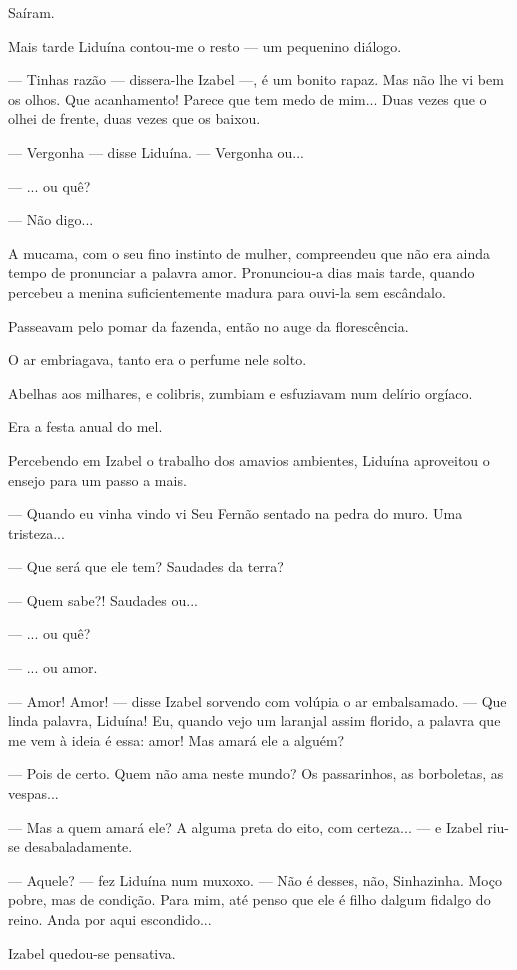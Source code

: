 Saíram.

Mais tarde Liduína contou-me o resto --- um pequenino diálogo.

--- Tinhas razão --- dissera-lhe Izabel ---, é um bonito rapaz. Mas não
lhe vi bem os olhos. Que acanhamento! Parece que tem medo de mim... Duas
vezes que o olhei de frente, duas vezes que os baixou.

--- Vergonha --- disse Liduína. --- Vergonha ou...

--- ... ou quê?

--- Não digo...

A mucama, com o seu fino instinto de mulher, compreendeu que não era
ainda tempo de pronunciar a palavra amor. Pronunciou-a dias mais tarde,
quando percebeu a menina suficientemente madura para ouvi-la sem
escândalo.

Passeavam pelo pomar da fazenda, então no auge da florescência.

O ar embriagava, tanto era o perfume nele solto.

Abelhas aos milhares, e colibris, zumbiam e esfuziavam num delírio
orgíaco.

Era a festa anual do mel.

Percebendo em Izabel o trabalho dos amavios ambientes, Liduína
aproveitou o ensejo para um passo a mais.

--- Quando eu vinha vindo vi Seu Fernão sentado na pedra do muro. Uma
tristeza...

--- Que será que ele tem? Saudades da terra?

--- Quem sabe?! Saudades ou...

--- ... ou quê?

--- ... ou amor.

--- Amor! Amor! --- disse Izabel sorvendo com volúpia o ar embalsamado.
--- Que linda palavra, Liduína! Eu, quando vejo um laranjal assim
florido, a palavra que me vem à ideia é essa: amor! Mas amará ele a
alguém?

--- Pois de certo. Quem não ama neste mundo? Os passarinhos, as
borboletas, as vespas...

--- Mas a quem amará ele? A alguma preta do eito, com certeza... --- e
Izabel riu-se desabaladamente.

--- Aquele? --- fez Liduína num muxoxo. --- Não é desses, não,
Sinhazinha. Moço pobre, mas de condição. Para mim, até penso que ele é
filho dalgum fidalgo do reino. Anda por aqui escondido...

Izabel quedou-se pensativa.

